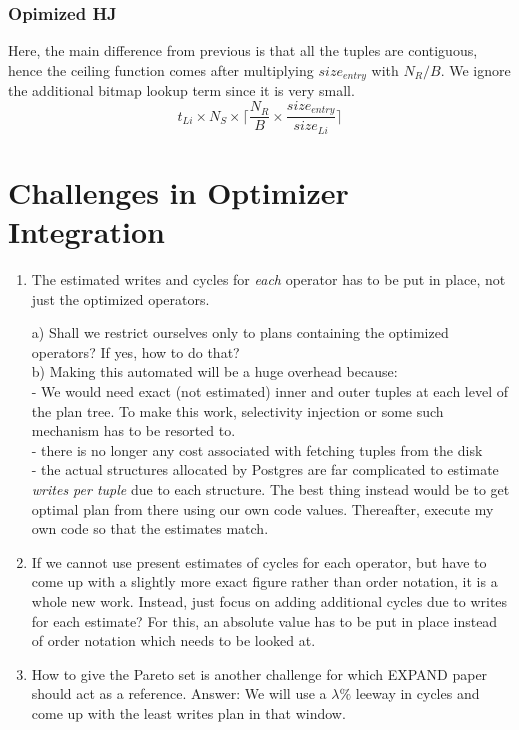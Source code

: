 \documentclass[10pt]{article}
\begin{document}
\subsubsection{Opimized HJ}
Here, the main difference from previous is that all the tuples are contiguous, hence the ceiling function comes after multiplying $size_{entry}$ with $N_R/B$. We ignore the additional bitmap lookup term since it is very small.
\begin{equation}
t_{Li} \times N_S\times \lceil\frac{N_R}{B} \times  \frac {size_{entry}}{size_{Li}} \rceil
\end{equation}

\section{Challenges in Optimizer Integration}
\begin{enumerate}
\item The estimated writes and cycles for \emph{each} operator has to be put in place, not just the optimized operators.

a) Shall we restrict ourselves only to plans containing the optimized operators? If yes, how to do that?\\
b) Making this automated will be a huge overhead because:\\
- We would need exact (not estimated) inner and outer tuples at each level of the plan tree. To make this work, selectivity injection or some such mechanism has to be resorted to.\\
- there is no longer any cost associated with fetching tuples from the disk\\
- the actual structures allocated by Postgres are far complicated to estimate \emph{writes per tuple} due to each structure. The best thing instead would be to get optimal plan from there using our own code values. Thereafter, execute my own code so that the estimates match.


\item If we cannot use present estimates of cycles for each operator, but have to come up with a slightly more exact figure rather than order notation, it is a whole new work. Instead, just focus on adding additional cycles due to writes for each estimate? For this, an absolute value has to be put in place instead of order notation which needs to be looked at.

\item How to give the Pareto set is another challenge for which EXPAND paper should act as a reference. Answer: We will use a $\lambda \%$ leeway in cycles and come up with the least writes plan in that window.


\end{enumerate}
\end{document}
